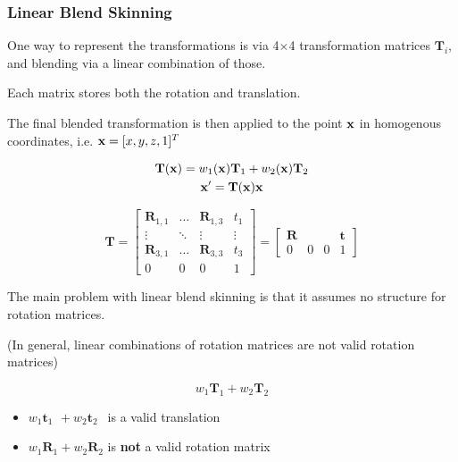 \documentclass{article}
\begin{document}
\subsubsection{Linear Blend Skinning}

One way to represent the transformations is via 4\(\times\)4 transformation matrices \(\mathbf{T}_i\),
and blending via a linear combination of those.

\vspace{5px}

Each matrix stores both the rotation and translation.

\vspace{5px}

The final blended transformation is then applied to the point \(\text{\textbf{x}}\) in homogenous
coordinates, i.e. \(\text{\textbf{x}} = [x, y, z, 1]^T\)

\begin{gather*}
    \mathbf{T}(\text{\textbf{x}}) = w_1(\text{\textbf{x}}) \mathbf{T}_1 + w_2(\text{\textbf{x}}) \mathbf{T}_2\\
    \text{\textbf{x}}' = \mathbf{T}(\text{\textbf{x}})\text{\textbf{x}}
\end{gather*}

\[
    \mathbf{T} = \begin{bmatrix}
        \mathbf{R}_{1,1} & \dots & \mathbf{R}_{1,3} & t_1 \\
        \vdots & \ddots & \vdots & \vdots \\
        \mathbf{R}_{3,1} & \dots & \mathbf{R}_{3,3} & t_3 \\
        0 & 0 & 0 & 1
    \end{bmatrix} =
    \begin{bmatrix}
        \mathbf{R} & & & \!\!\mathbf{t}\\
        0 & \!\!\!0 & \!\!\!0 & \!\!\!1
    \end{bmatrix}
\]

\vspace{5px}

The main problem with linear blend skinning is that it assumes no structure for rotation matrices.

(In general, linear combinations of rotation matrices are not valid rotation matrices)

\[
    w_1 \mathbf{T}_1 + w_2 \mathbf{T}_2
\]

\begin{itemize}[itemsep=-4px]
    \item \(w_1 \mathbf{t}_1 \: \, + w_2 \mathbf{t}_2 \; \, \) is a valid translation
    \item \(w_1 \mathbf{R}_1 + w_2 \mathbf{R}_2\) is \textbf{not} a valid rotation matrix
\end{itemize}
\end{document}
